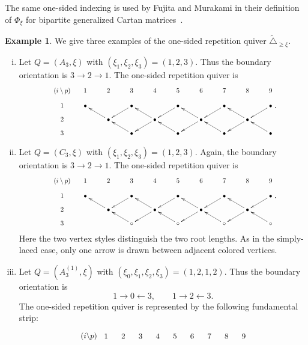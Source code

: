 \documentclass[12pt, leqno]{amsart}
\numberwithin{equation}{section}
\theoremstyle{plain}
\theoremstyle{definition}
\newtheorem{example}[lemma]{Example}
\newcommand{\Dynkin}{\triangle}
\newcommand{\tDynkin}{{\widetilde{\Dynkin}}}
\begin{document}
\smallskip
The same one-sided indexing is used by Fujita and Murakami
in their definition of $\Phi_\xi$ for bipartite generalized Cartan
matrices~\cite[Definition~2.13]{FM23general}.

\begin{example}\label{ex: one-sided repetition quivers}
We give three examples of the one-sided repetition quiver \(\tDynkin_{\geq\xi}\).

\begin{enumerate}[(i)]
\item Let $Q=(A_3,\xi)$ with $(\xi_1,\xi_2,\xi_3)=(1,2,3)$.
Thus the boundary orientation is $3\to2\to1$.
The one-sided repetition quiver is
\[
\raisebox{7mm}{
\scalebox{0.78}{\xymatrix@!C=4mm@R=3mm{
(i\setminus p)&1&2&3&4&5&6&7&8&9\\
1&\bullet&&\bullet\ar[dl]&&\bullet\ar[dl]&&
  \bullet\ar[dl]&&\bullet\ar[dl]\\
2&&\bullet\ar[ul]&&\bullet\ar[ul]\ar[dl]&&
  \bullet\ar[ul]\ar[dl]&&\bullet\ar[ul]\ar[dl]&\\
3&&&\bullet\ar[ul]&&\bullet\ar[ul]&&
  \bullet\ar[ul]&&\bullet\ar[ul]
}}}.
\]

\item Let $Q=(C_3,\xi)$ with $(\xi_1,\xi_2,\xi_3)=(1,2,3)$.
Again, the boundary orientation is $3\to2\to1$.
The one-sided repetition quiver is
\[
\raisebox{7mm}{
\scalebox{0.78}{\xymatrix@!C=4mm@R=3mm{
(i\setminus p)&1&2&3&4&5&6&7&8&9\\
1&\bullet&&\bullet\ar[dl]&&\bullet\ar[dl]&&
  \bullet\ar[dl]&&\bullet\ar[dl]\\
2&&\bullet\ar[ul]&&\bullet\ar[ul]\ar[dl]&&
  \bullet\ar[ul]\ar[dl]&&\bullet\ar[ul]\ar[dl]&\\
3&&&\circ\ar[ul]&&\circ\ar[ul]&&
  \circ\ar[ul]&&\circ\ar[ul]
}}}.
\]
Here the two vertex styles distinguish the two root lengths.  As in
the simply-laced case, only one arrow is drawn between adjacent
colored vertices.
\item 
Let $Q=(A_3^{(1)},\xi)$ with $(\xi_0,\xi_1,\xi_2,\xi_3)=(1,2,1,2)$.
Thus the boundary orientation is
\[
1\longrightarrow0\longleftarrow3,
\qquad
1\longrightarrow2\longleftarrow3.
\]
The one-sided repetition quiver is represented by the following
fundamental strip:
\[
\begin{tikzpicture}[
  x=0.72cm,
  y=0.72cm,
  baseline=(current bounding box.center),
  every node/.style={font=\small},
  vertex/.style={circle,fill=black,inner sep=1.45pt},
  arrow/.style={->,>=stealth,thin}
]

\node at (0,0.65) {$(i\backslash p)$};
\foreach \p in {1,...,9}{
  \node at (\p,0.65) {\p};
}


\end{tikzpicture}\]
\end{enumerate}
\end{example}
\end{document}
